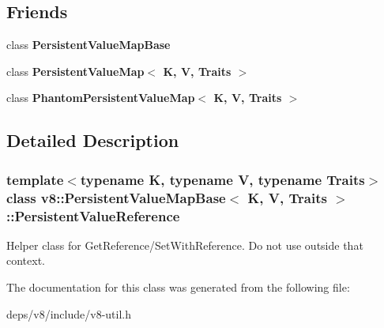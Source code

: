 \subsection*{Friends}
\begin{DoxyCompactItemize}
\item 
\hypertarget{classv8_1_1_persistent_value_map_base_1_1_persistent_value_reference_ae5cccd63ef6d94c509ad8b6970d4017d}{}class {\bfseries Persistent\+Value\+Map\+Base}\label{classv8_1_1_persistent_value_map_base_1_1_persistent_value_reference_ae5cccd63ef6d94c509ad8b6970d4017d}

\item 
\hypertarget{classv8_1_1_persistent_value_map_base_1_1_persistent_value_reference_a22fcaa9f3ba179f3bb566eda5b93790d}{}class {\bfseries Persistent\+Value\+Map$<$ K, V, Traits $>$}\label{classv8_1_1_persistent_value_map_base_1_1_persistent_value_reference_a22fcaa9f3ba179f3bb566eda5b93790d}

\item 
\hypertarget{classv8_1_1_persistent_value_map_base_1_1_persistent_value_reference_adb6fb2c3a4c374690ea3c7719d66898b}{}class {\bfseries Phantom\+Persistent\+Value\+Map$<$ K, V, Traits $>$}\label{classv8_1_1_persistent_value_map_base_1_1_persistent_value_reference_adb6fb2c3a4c374690ea3c7719d66898b}

\end{DoxyCompactItemize}


\subsection{Detailed Description}
\subsubsection*{template$<$typename K, typename V, typename Traits$>$class v8\+::\+Persistent\+Value\+Map\+Base$<$ K, V, Traits $>$\+::\+Persistent\+Value\+Reference}

Helper class for Get\+Reference/\+Set\+With\+Reference. Do not use outside that context. 

The documentation for this class was generated from the following file\+:\begin{DoxyCompactItemize}
\item 
deps/v8/include/v8-\/util.\+h\end{DoxyCompactItemize}
